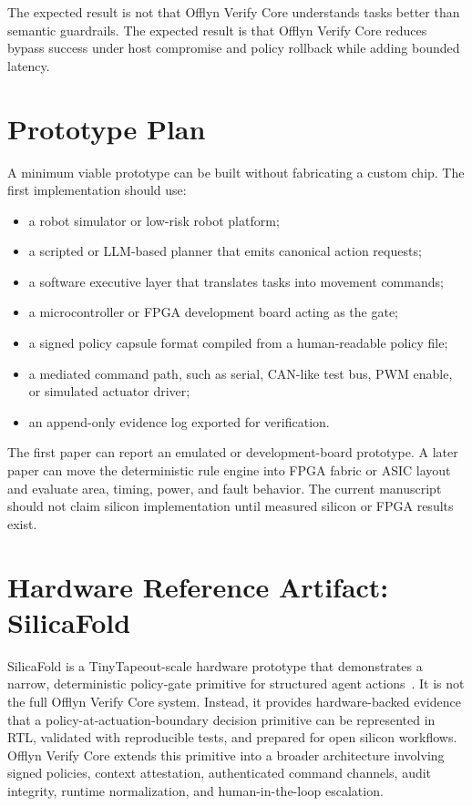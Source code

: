 \documentclass[10pt]{article}
\newcommand{\ovc}{Offlyn Verify Core\xspace}
\begin{document}
The expected result is not that \ovc understands tasks better than semantic guardrails. The expected result is that \ovc reduces bypass success under host compromise and policy rollback while adding bounded latency.

\section{Prototype Plan}

A minimum viable prototype can be built without fabricating a custom chip. The first implementation should use:

\begin{itemize}[leftmargin=*]
  \item a robot simulator or low-risk robot platform;
  \item a scripted or LLM-based planner that emits canonical action requests;
  \item a software executive layer that translates tasks into movement commands;
  \item a microcontroller or FPGA development board acting as the gate;
  \item a signed policy capsule format compiled from a human-readable policy file;
  \item a mediated command path, such as serial, CAN-like test bus, PWM enable, or simulated actuator driver;
  \item an append-only evidence log exported for verification.
\end{itemize}

The first paper can report an emulated or development-board prototype. A later paper can move the deterministic rule engine into FPGA fabric or ASIC layout and evaluate area, timing, power, and fault behavior. The current manuscript should not claim silicon implementation until measured silicon or FPGA results exist.

\section{Hardware Reference Artifact: SilicaFold}

SilicaFold is a TinyTapeout-scale hardware prototype that demonstrates a narrow, deterministic policy-gate primitive for structured agent actions~\cite{silicafold2026}. It is not the full \ovc system. Instead, it provides hardware-backed evidence that a policy-at-actuation-boundary decision primitive can be represented in RTL, validated with reproducible tests, and prepared for open silicon workflows. \ovc extends this primitive into a broader architecture involving signed policies, context attestation, authenticated command channels, audit integrity, runtime normalization, and human-in-the-loop escalation.
\end{document}
